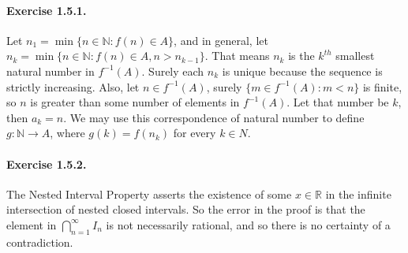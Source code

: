 \documentclass{article}
\newcommand{\inv}{^{-1}}
\newcommand{\N}{\mathbb{N}}
\newcommand{\R}{\mathbb{R}}
\begin{document}
\paragraph{Exercise 1.5.1.}
Let $n_1 = \min\{n\in \N : f(n) \in A\}$, and in general, let $n_k = \min\{ n\in \N : f(n) \in A, n > n_{k-1}\}$. That means $n_k$ is the $k^{th}$ smallest natural number in $f\inv(A)$. Surely each $n_k$ is unique because the sequence is strictly increasing. Also, let $n \in f\inv (A)$, surely $\{ m \in f\inv(A) : m < n\}$ is finite, so $n$ is greater than some number of elements in $f\inv (A)$. Let that number be $k$, then $a_k = n$. We may use this correspondence of natural number to define $g:\N \to A$, where $g(k) = f(n_k)$ for every $k\in N$.

\paragraph{Exercise 1.5.2.}
The Nested Interval Property asserts the existence of some $x\in \R$ in the infinite intersection of nested closed intervals. So the error in the proof is that the element in $\bigcap_{n=1}^\infty I_n$ is not necessarily rational, and so there is no certainty of a contradiction.
\end{document}
